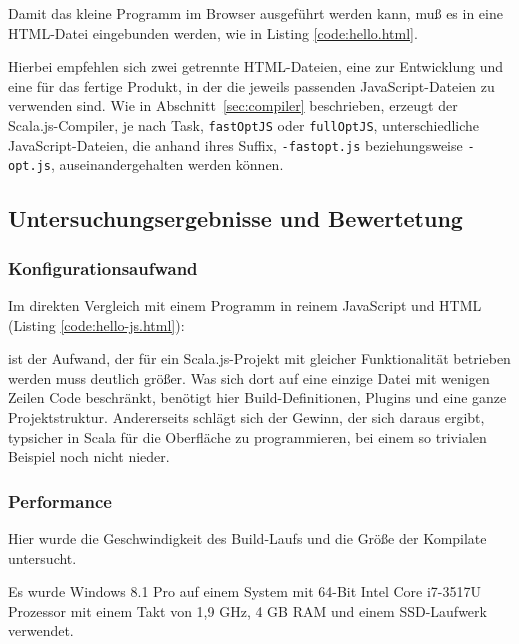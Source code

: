 \documentclass[a4paper, 12pt, hidelinks, listof=totoc, listoftables=totoc, bibliography=totoc]{scrreprt}
\begin{document}
Damit das kleine Programm im Browser ausgeführt werden kann, muß es in eine HTML-Datei eingebunden werden, wie in Listing \ref{code:hello.html}.



Hierbei empfehlen sich zwei getrennte HTML-Dateien, eine zur Entwicklung und eine für das fertige Produkt, in der die jeweils passenden JavaScript-Dateien zu verwenden sind. Wie in Abschnitt~\ref{sec:compiler} beschrieben, erzeugt der Scala.js-Compiler, je nach Task, \texttt{fastOptJS} oder \texttt{fullOptJS}, unterschiedliche JavaScript-Dateien, die anhand ihres Suffix, \texttt{-fastopt.js} beziehungsweise \texttt{-opt.js}, auseinandergehalten werden können.

\subsection{Untersuchungsergebnisse und Bewertetung}

\subsubsection{Konfigurationsaufwand}

Im direkten Vergleich mit einem Programm in reinem JavaScript und HTML (Listing \ref{code:hello-js.html}):



ist der Aufwand, der für ein Scala.js-Projekt mit gleicher Funktionalität betrieben werden muss deutlich größer. Was sich dort auf eine einzige Datei mit wenigen Zeilen Code beschränkt, benötigt hier Build-Definitionen, Plugins und eine ganze Projektstruktur. Andererseits schlägt sich der Gewinn, der sich daraus ergibt, typsicher in Scala für die Oberfläche zu programmieren, bei einem so trivialen Beispiel noch nicht nieder.

\subsubsection{Performance}

Hier wurde die Geschwindigkeit des Build-Laufs und die Größe der Kompilate untersucht.

Es wurde Windows 8.1 Pro auf einem System mit 64-Bit Intel Core i7-3517U Prozessor mit einem Takt von 1,9 GHz, 4 GB RAM und einem SSD-Laufwerk verwendet.
\end{document}
